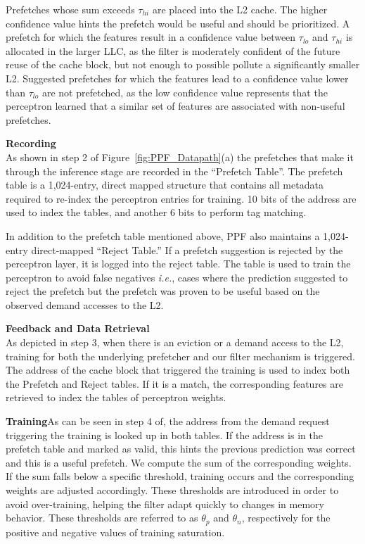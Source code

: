 Prefetches whose sum exceeds $\tau_{hi}$ are placed into the L2 cache.
The higher confidence value hints the prefetch would be useful and
should be prioritized.  A prefetch for which the features result in a
confidence value between $\tau_{lo}$ and $\tau_{hi}$ is allocated in
the larger LLC, as the filter is moderately confident of the future
reuse of the cache block, but not enough to possible pollute a
significantly smaller L2.  Suggested prefetches for which the features
lead to a confidence value lower than $\tau_{lo}$ are not prefetched,
as the low confidence value represents that the perceptron learned
that a similar set of features are associated with non-useful
prefetches.

\noindent \textbf{Recording}\\
As shown in step 2 of Figure~\ref{fig:PPF_Datapath}(a) the prefetches
that make it through the inference stage are recorded in the
``Prefetch Table''. The prefetch table is a 1,024-entry, direct mapped
structure that contains all metadata required to re-index the
perceptron entries for training. {\color{red}10 bits of the address are used to index 
the tables, and another 6 bits to perform tag matching.} 

In addition to the prefetch table mentioned above, PPF also maintains
a 1,024-entry direct-mapped ``Reject Table.'' If a prefetch suggestion
is rejected by the perceptron layer, it is logged into the reject
table. The table is used to train the perceptron to avoid false
negatives \textit{i.e.}, cases where the prediction suggested to
reject the prefetch but the prefetch was proven to be useful based on
the observed demand accesses to the L2.

\noindent \textbf{Feedback and Data Retrieval}\\
As depicted in step 3, when there is an eviction or a demand access 
to the L2, training for both the {\color{red}underlying} prefetcher and our filter 
mechanism is triggered. The address of the cache block that triggered 
the training is used to index both the Prefetch and Reject tables. 
{\color{red}If it is a match, the corresponding
features are retrieved to index the tables of perceptron weights.}


\noindent \textbf{Training}\newline As can be seen in step 4 of, 
the address from the demand
request triggering the training is looked up in both tables. If the
address is in the prefetch table and marked as valid, this hints the
previous prediction was correct and this is a useful prefetch. We
compute the sum of the corresponding weights. If the sum falls below a
specific threshold, training occurs and the corresponding weights are
adjusted accordingly. These thresholds are introduced in order to
avoid over-training, helping the filter adapt quickly to changes in
memory behavior. These thresholds are referred to as $\theta_p$ and
$\theta_n$, respectively for the positive and negative values of
training saturation.

